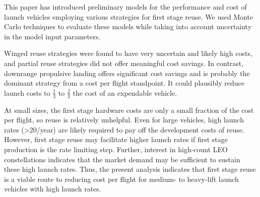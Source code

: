\documentclass{iaf-iac}
\begin{document}
\begin{multicols}{2}
This paper has introduced preliminary models for the performance and cost of launch vehicles employing various strategies for first stage reuse. We used Monte Carlo techniques to evaluate these models while taking into account uncertainty in the model input parameters.

Winged reuse strategies were found to have very uncertain and likely high costs, and partial reuse strategies did not offer meaningful cost savings. In contrast, downrange propulsive landing offers significant cost savings and is probably the dominant strategy from a cost per flight standpoint. It could plausibly reduce launch costs to $\frac{1}{3}$ to $\frac{2}{3}$ the cost of an expendable vehicle.

At small sizes, the first stage hardware costs are only a small fraction of the cost per flight, so reuse is relatively unhelpful. Even for large vehicles, high launch rates (>20/year) are likely required to pay off the development costs of reuse. However, first stage reuse may facilitate higher launch rates if first stage production is the rate limiting step. Further, interest in high-count LEO constellations indicates that the market demand may be sufficient to sustain these high launch rates. Thus, the present analysis indicates that first stage reuse is a viable route to reducing cost per flight for medium- to heavy-lift launch vehicles with high launch rates. 


\end{multicols}
\end{document}
